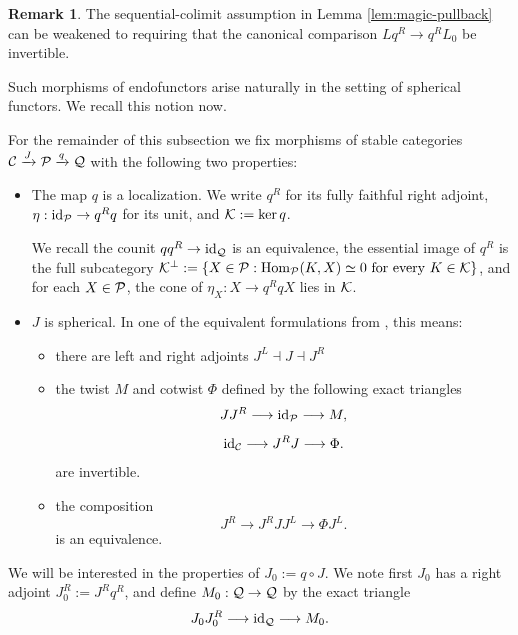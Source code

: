 \documentclass[12pt, letter]{amsart}
\theoremstyle{definition}
\newtheorem{remark}[dummy]{Remark}
\begin{document}
\begin{remark}
    The sequential-colimit assumption in Lemma \ref{lem:magic-pullback} can be weakened to requiring that the canonical comparison $Lq^R\to q^RL_0$ be invertible.
\end{remark}

Such morphisms of endofunctors arise naturally in the setting of spherical functors.  We recall this notion now. 

For the remainder of this subsection we fix morphisms of stable categories 
$\mathcal{C} \xrightarrow{J} \mathcal{P} \xrightarrow{q} \mathcal{Q}$ 
with the following two properties: 
\begin{itemize}
    \item The map $q$ is a localization.  
    We write $q^R$  for its fully faithful right adjoint, 
    \(\eta:\mathrm{id}_{\mathcal{P}}\to q^R q\) for its unit, and $
  \mathcal{K}:=\ker q$.  
  
  We recall
    the counit \(qq^R\to\mathrm{id}_{\mathcal{Q}}\) is an equivalence,  
 the essential image of
\(q^R\) is the full subcategory 
$\mathcal{K}^\perp
  :=
  \{X\in\mathcal{P}:\operatorname{Hom}_{\mathcal{P}}(K,X)\simeq0\text{ for every }K\in\mathcal{K}\}$, and
for each \(X\in\mathcal{P}\), the cone of \(\eta_X:X\to q^RqX\) lies in \(\mathcal{K}\).
\item $J$ is spherical.  In one of the equivalent formulations from \cite[Theorem~1.1]{AL}, this means: 
\begin{itemize}
    \item there are left and right adjoints  $J^L\dashv J\dashv J^R$ 
    \item the twist $M$ and cotwist $\Phi$ defined by the following exact triangles 
\begin{equation}\label{eq:twist}
JJ^R\longrightarrow\mathrm{id}_{\mathcal{P}}\longrightarrow M,
\end{equation}
\[
  \mathrm{id}_{\mathcal{C}}\longrightarrow J^RJ\longrightarrow\Phi.
\]
are invertible.
\item the composition  
\begin{equation}\label{eq:spherical-comparison}
  J^R\longrightarrow J^RJJ^L\longrightarrow\Phi J^L.
\end{equation}
is an equivalence. 
\end{itemize} 


\end{itemize}

We will be interested in the properties of $J_0 := q \circ J$.  We note first $J_0$ has  a right adjoint   $J_0^R := J^R q^R$, and define $M_0: \mathcal{Q} \to \mathcal{Q}$  by the exact triangle
\[
J_0 J_0^R \longrightarrow\mathrm{id}_{\mathcal{Q}} \longrightarrow M_0.
\]
\end{document}
